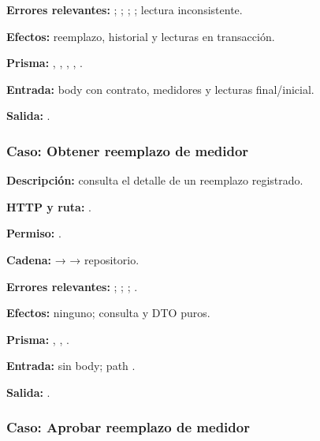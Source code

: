 \textbf{Errores relevantes:} \texttt{}; \texttt{}; \texttt{}; \texttt{}; lectura inconsistente.  

\textbf{Efectos:} reemplazo, historial y lecturas en transacción.  

\textbf{Prisma:} \texttt{}, \texttt{}, \texttt{}, \texttt{}, \texttt{}.  

\textbf{Entrada:} body \texttt{} con contrato, medidores y lecturas final/inicial.  

\textbf{Salida:} \texttt{}.


\subsubsection{Caso: Obtener reemplazo de medidor}


\textbf{Descripción:} consulta el detalle de un reemplazo registrado.  

\textbf{HTTP y ruta:} \texttt{}.  

\textbf{Permiso:} \texttt{}.  

\textbf{Cadena:} \texttt{} → \texttt{} → repositorio.  

\textbf{Errores relevantes:} \texttt{}; \texttt{}; \texttt{}; \texttt{}.  

\textbf{Efectos:} ninguno; consulta y DTO puros.  

\textbf{Prisma:} \texttt{}, \texttt{}, \texttt{}.  

\textbf{Entrada:} sin body; path \texttt{}.  

\textbf{Salida:} \texttt{}.


\subsubsection{Caso: Aprobar reemplazo de medidor}



